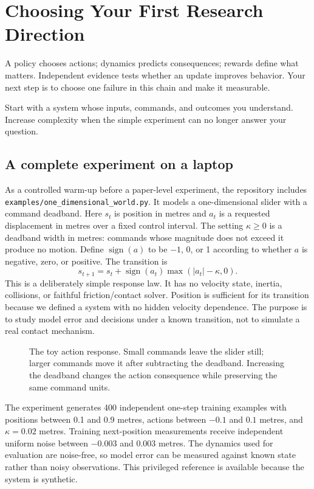 \chapter{Choosing Your First Research Direction}
\label{ch:directions}

A policy chooses actions; dynamics predicts consequences; rewards define what matters. Independent evidence tests whether an update improves behavior. Your next step is to choose one failure in this chain and make it measurable.

Start with a system whose inputs, commands, and outcomes you understand. Increase complexity when the simple experiment can no longer answer your question.

\section{A complete experiment on a laptop}
As a controlled warm-up before a paper-level experiment, the repository includes \nolinkurl{examples/one_dimensional_world.py}. It models a one-dimensional slider with a command deadband. Here $s_t$ is position in metres and $a_t$ is a requested displacement in metres over a fixed control interval. The setting $\kappa\geq0$ is a deadband width in metres: commands whose magnitude does not exceed it produce no motion. Define $\operatorname{sign}(a)$ to be $-1$, 0, or 1 according to whether $a$ is negative, zero, or positive. The transition is
\begin{equation}
 s_{t+1}=s_t+\operatorname{sign}(a_t)\max(|a_t|-\kappa,0).
 \label{eq:toy-transition}
\end{equation}
This is a deliberately simple response law. It has no velocity state, inertia, collisions, or faithful friction/contact solver. Position is sufficient for its transition because we defined a system with no hidden velocity dependence. The purpose is to study model error and decisions under a known transition, not to simulate a real contact mechanism.

\begin{figure}[htbp]\centering

\caption{The toy action response. Small commands leave the slider still; larger commands move it after subtracting the deadband. Increasing the deadband changes the action consequence while preserving the same command units.}
\label{fig:deadband}
\end{figure}

The experiment generates 400 independent one-step training examples with positions between 0.1 and 0.9 metres, actions between $-0.1$ and $0.1$ metres, and $\kappa=0.02$ metres. Training next-position measurements receive independent uniform noise between $-0.003$ and $0.003$ metres. The dynamics used for evaluation are noise-free, so model error can be measured against known state rather than noisy observations. This privileged reference is available because the system is synthetic.

